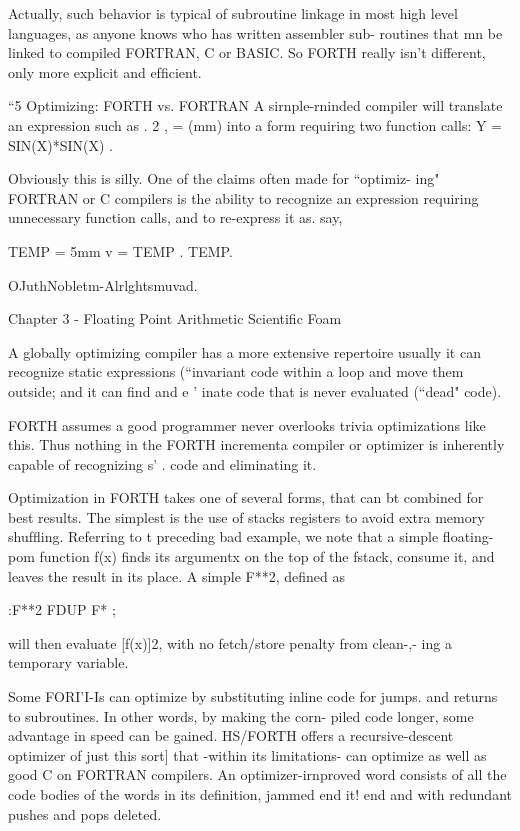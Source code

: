 Actually, such behavior is typical of subroutine linkage in most high
level languages, as anyone knows who has written assembler sub-
routines that mn be linked to compiled FORTRAN, C or BASIC.
So FORTH really isn’t different, only more explicit and efﬁcient.

“5 Optimizing: FORTH vs. FORTRAN
A sirnple-rninded compiler will translate an expression such as
. 2
, = (mm)
into a form requiring two function calls:
Y = SIN(X)*SIN(X) .

Obviously this is silly. One of the claims often made for “optimiz-
ing" FORTRAN or C compilers is the ability to recognize an
expression requiring unnecessary function calls, and to re-express
it as. say,

TEMP = 5mm
v = TEMP . TEMP.

OJuthNobletm-Alrlghtsmuvad.

Chapter 3 - Floating Point Arithmetic Scientiﬁc Foam

 
    
   
  
  
 

A globally optimizing compiler has a more extensive repertoire
usually it can recognize static expressions (“invariant code
within a loop and move them outside; and it can find and e '
inate code that is never evaluated (“dead" code).

FORTH assumes a good programmer never overlooks trivia
optimizations like this. Thus nothing in the FORTH incrementa
compiler or optimizer is inherently capable of recognizing s' .
code and eliminating it.

Optimization in FORTH takes one of several forms, that can bt
combined for best results. The simplest is the use of stacks
registers to avoid extra memory shufﬂing. Referring to t
preceding bad example, we note that a simple floating-pom
function f(x) ﬁnds its argumentx on the top of the fstack, consume
it, and leaves the result in its place. A simple F**2, deﬁned as

:F**2 FDUP F* ;

will then evaluate [f(x)]2, with no fetch/store penalty from clean-,-
ing a temporary variable.

Some FORI'I-Is can optimize by substituting inline code for jumps.
and returns to subroutines. In other words, by making the corn-
piled code longer, some advantage in speed can be gained.
HS/FORTH offers a recursive-descent optimizer of just this sort]
that -within its limitations- can optimize as well as good C on
FORTRAN compilers. An optimizer-irnproved word consists of
all the code bodies of the words in its definition, jammed end it!
end and with redundant pushes and pops deleted.

